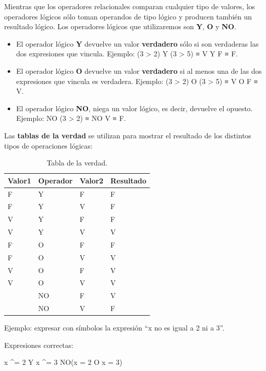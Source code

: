\documentclass[
]{book}
\newenvironment{Shaded}{\begin{snugshade}}{\end{snugshade}}
\newcommand{\NormalTok}[1]{#1}
\providecommand{\tightlist}{%
  \setlength{\itemsep}{0pt}\setlength{\parskip}{0pt}}
\begin{document}
Mientras que los operadores relacionales comparan cualquier tipo de valores, los operadores lógicos sólo toman operandos de tipo lógico y producen también un resultado lógico. Los operadores lógicos que utilizaremos son \textbf{Y}, \textbf{O} y \textbf{NO}.

\begin{itemize}
\tightlist
\item
  El operador lógico \textbf{Y} devuelve un valor \textbf{verdadero} sólo si son verdaderas las dos expresiones que vincula. Ejemplo: (3 \textgreater{} 2) Y (3 \textgreater{} 5) ≡ V Y F ≡ F.
\item
  El operador lógico \textbf{O} devuelve un valor \textbf{verdadero} si al menos una de las dos expresiones que vincula es verdadera. Ejemplo: (3 \textgreater{} 2) O (3 \textgreater{} 5) ≡ V O F ≡ V.
\item
  El operador lógico \textbf{NO}, niega un valor lógico, es decir, devuelve el opuesto. Ejemplo: NO (3 \textgreater{} 2) ≡ NO V ≡ F.
\end{itemize}

Las \textbf{tablas de la verdad} se utilizan para mostrar el resultado de los distintos tipos de operaciones lógicas:

\begin{table}

\caption{\label{tab:unnamed-chunk-16}Tabla de la verdad.}
\centering
\begin{tabular}[t]{l|l|l|l}
\hline
Valor1 & Operador & Valor2 & Resultado\\
\hline
F & Y & F & F\\
\hline
F & Y & V & F\\
\hline
V & Y & F & F\\
\hline
V & Y & V & V\\
\hline
F & O & F & F\\
\hline
F & O & V & V\\
\hline
V & O & F & V\\
\hline
V & O & V & V\\
\hline
 & NO & F & V\\
\hline
 & NO & V & F\\
\hline
\end{tabular}
\end{table}

Ejemplo: expresar con símbolos la expresión ``x no es igual a 2 ni a 3''.

Expresiones correctas:

\begin{Shaded}
\begin{Highlighting}[]
\NormalTok{x \^{}= 2 Y x \^{}= 3}
\NormalTok{NO(x = 2 O x = 3)}
\end{Highlighting}
\end{Shaded}
\end{document}
